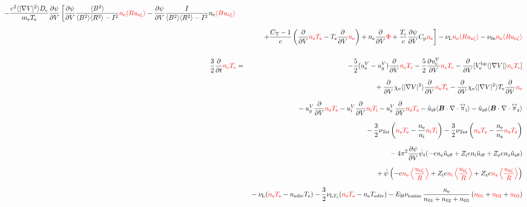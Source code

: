 \documentclass[11pt]{article}
\def\bvec#1{\leavevmode\hbox{\boldmath$#1$}}
\let\vec=\bvec
\def\r#1{{\rm#1}}
\def\ave#1{\left\langle#1\right\rangle}
\def\aves#1{\langle#1\rangle}
\def\dd#1#2{\frac{\partial #1}{\partial #2}}
\def\tensor#1{\mathord{\displaystyle\mathop{#1}^\leftrightarrow}}
\def\para{\parallel}
\def\ddV{\frac{\partial}{\partial V}}
\def\ddt{\frac{\partial}{\partial t}}
\def\psid{\dot{\psi}}
\def\psit{\psi_t}
\def\psitd{\dot{\psit}}
\def\me{m_\r{e}}
\def\nee{n_\r{e}}
\def\ni{n_\r{i}}
\def\nz{n_\r{z}}
\def\Te{T_\r{e}}
\def\Ti{T_\r{i}}
\def\Tz{T_\r{z}}
\def\Zi{Z_\r{i}}
\def\Zz{Z_\r{z}}
\def\uzt#1{u_{\r{#1}\zeta}}
\def\upara#1{u_{\r{#1}\para}}
\def\uhatth#1{\hat{u}_{\r{#1}\theta}}
\def\uV#1{u_\r{#1}^V}
\def\ugV{u_{g}^V}
\def\chis#1{\chi_\r{#1}}
\def\De{D_\r{e}}
\def\nun#1{\nu_\r{0#1}}
\def\ndiv#1{n_\r{#1div}}
\def\Tdiv#1{T_\r{#1div}}
\def\nuLT#1{\nu_{\r{L}T_\r{#1}}}
\def\bri{\aves{B^2}\aves{R^2} - I^2}
\def\EH{E_\r{H}}
\def\nna{n_{01}}
\def\nnb{n_{02}}
\def\nnc{n_{03}}
\def\nuL{\nu_\r{L}}
\def\nuion{\nu_\r{ionize}}
\def\red#1{\textcolor{red}{#1}}
\begin{document}
\begin{eqnarray}
%
  - \frac{e^2 \aves{|\nabla V|^2} \De}{\me\Te} \dd{\psi}{V} 
%
    \left[  \dd{\psi}{V} \frac{\aves{B^2}}{\bri} \red{\nee \aves{R \uzt{e}}}
%
          - \dd{\psi}{V} \frac{I}{\bri} \nee \red{\aves{B \upara{e}}} \right.
\nonumber\\[2.5mm]&&{}
%
    \left.+ \frac{C_\r{T}-1}{e} \left( \ddV \red{\nee \Te} - \Te \ddV \red{\nee} \right)
%
	  + \nee \ddV \red{\Phi}
%
	  + \frac{\Te}{e} \dd{\psi}{V} C_\r{p} \red{\nee} \right]
  - \nuL  \red{\nee \aves{R \uzt{e}}}
%
  - \nun{e} \red{\nee \aves{R \uzt{e}}}
\\[5mm]
 \frac{3}{2} \ddt \red{\nee \Te} &=& 
%
  - \frac{5}{2} ( \uV{e} - \ugV ) \ddV \red{\nee \Te}
%
  - \frac{5}{2} \dd{\uV{e}}{V} \red{\nee \Te}
%
  - \ddV [V_\r{e}^\r{hp} \aves{|\nabla V|}   \red{\nee \Te}]
\nonumber\\[2.5mm]&&{}
%
  + \ddV \chis{e} \aves{|\nabla V|^2}\ddV \red{\nee \Te}
  - \ddV \chis{e} \aves{|\nabla V|^2}\Te \ddV \red{\nee}
\nonumber\\[2.5mm]&&{}
%
  - \ugV   \ddV \red{\nee \Te}
  - \uV{i} \ddV \red{\ni  \Ti}
  - \uV{z} \ddV \red{\nz  \Tz}
%
  - \uhatth{i} \aves{\vec{B}\cdot\nabla\cdot\tensor{\pi}_\r{i}}
  - \uhatth{z} \aves{\vec{B}\cdot\nabla\cdot\tensor{\pi}_\r{z}}
\nonumber\\[2.5mm]&&{}
%
  - \frac{3}{2} \nu_\r{Tei} \left(\red{\nee \Te} - \frac{\nee}{\ni} \red{\ni \Ti}\right)
  - \frac{3}{2} \nu_\r{Tez} \left(\red{\nee \Te} - \frac{\nee}{\nz} \red{\nz \Tz}\right)
\nonumber\\[2.5mm]&&{}
%
%
%
  - 4\pi^2 \dd{\psi}{V} \dot{\psi}_t 
  (-    e \nee \uhatth{e} + \Zi e \ni  \uhatth{i} + \Zz e \nz  \uhatth{z})
%
\nonumber\\[2.5mm]&&{}
%
  +\dot{\psi}\left(-     e \red{\nee \ave{\frac{\uzt{e}}{R}}}
	           + \Zi e \red{\ni  \ave{\frac{\uzt{i}}{R}}}
	           + \Zz e \red{\nz  \ave{\frac{\uzt{z}}{R}}}\right)
\nonumber\\[2.5mm]&&{}
%
  - \nuL (\red{\nee\Te} - \ndiv{e}\Te)
%
  - \frac{3}{2} \nuLT{e} (\red{\nee\Te} - \nee\Tdiv{e})
%
  - \EH \nuion\, \frac{\nee}{\nna + \nnb + \nnc}\, (\red{\nna} + \red{\nnb} + \red{\nnc})

\end{eqnarray}
\end{document}
